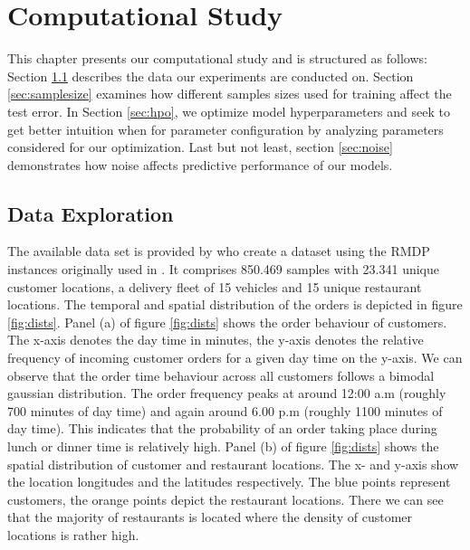 \chapter{Computational Study}\label{chap:comp}

This chapter presents our computational study and is structured as follows: 
Section \ref{sec:data} describes the data our experiments are conducted on.
Section \ref{sec:samplesize} examines how different samples sizes used for training affect the test error.
In Section \ref{sec:hpo}, we optimize model hyperparameters and seek to get better intuition when for parameter configuration by analyzing parameters considered for our optimization.
Last but not least, section \ref{sec:noise} demonstrates how noise affects predictive performance of our models.

\section{Data Exploration}\label{sec:data}
The available data set is provided by \cite{Hildebrandt2020_EAT} who create a dataset using the RMDP instances originally used in \cite{UlmerRMDP}. It comprises 850.469 samples with 23.341 unique customer locations, a delivery fleet of 15 vehicles and 15 unique restaurant locations. The temporal and spatial distribution of the orders is depicted in figure \ref{fig:dists}. 
Panel (a) of figure \ref{fig:dists} shows the order behaviour of customers. The x-axis denotes the day time in minutes, the y-axis denotes the relative frequency of incoming customer orders for a given day time on the y-axis. We can observe that the order time behaviour across all customers follows a bimodal gaussian distribution. The order frequency peaks at around 12:00 a.m (roughly 700 minutes of day time) and again around 6.00 p.m (roughly 1100 minutes of day time). This indicates that the probability of an order taking place during lunch or dinner time is relatively high.  
Panel (b) of figure \ref{fig:dists} shows the spatial distribution of customer and restaurant locations. The x- and y-axis show the location longitudes and the latitudes respectively. The blue points represent customers, the orange points depict the restaurant locations. There we can see that the majority of restaurants is located where the density of customer locations is rather high. 
